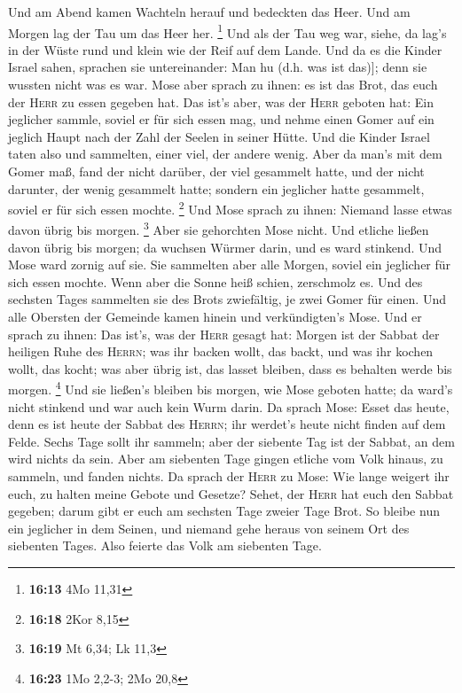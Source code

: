  Und am Abend kamen Wachteln herauf und bedeckten das
Heer. Und am Morgen lag der Tau um das Heer her. \footnote{\textbf{16:13}
  4Mo 11,31}  Und als der Tau weg war, siehe, da lag's in
der Wüste rund und klein wie der Reif auf dem Lande.  Und
da es die Kinder Israel sahen, sprachen sie untereinander: Man hu (d.h.
was ist das){]}; denn sie wussten nicht was es war. Mose aber sprach zu
ihnen: es ist das Brot, das euch der \textsc{Herr} zu essen gegeben hat.
 Das ist's aber, was der \textsc{Herr} geboten hat: Ein
jeglicher sammle, soviel er für sich essen mag, und nehme einen Gomer
auf ein jeglich Haupt nach der Zahl der Seelen in seiner Hütte.
 Und die Kinder Israel taten also und sammelten, einer
viel, der andere wenig.  Aber da man's mit dem Gomer maß,
fand der nicht darüber, der viel gesammelt hatte, und der nicht
darunter, der wenig gesammelt hatte; sondern ein jeglicher hatte
gesammelt, soviel er für sich essen mochte. \footnote{\textbf{16:18}
  2Kor 8,15}  Und Mose sprach zu ihnen: Niemand lasse
etwas davon übrig bis morgen. \footnote{\textbf{16:19} Mt 6,34; Lk 11,3}
 Aber sie gehorchten Mose nicht. Und etliche ließen davon
übrig bis morgen; da wuchsen Würmer darin, und es ward stinkend. Und
Mose ward zornig auf sie.  Sie sammelten aber alle
Morgen, soviel ein jeglicher für sich essen mochte. Wenn aber die Sonne
heiß schien, zerschmolz es.  Und des sechsten Tages
sammelten sie des Brots zwiefältig, je zwei Gomer für einen. Und alle
Obersten der Gemeinde kamen hinein und verkündigten's Mose.
 Und er sprach zu ihnen: Das ist's, was der \textsc{Herr}
gesagt hat: Morgen ist der Sabbat der heiligen Ruhe des \textsc{Herrn};
was ihr backen wollt, das backt, und was ihr kochen wollt, das kocht;
was aber übrig ist, das lasset bleiben, dass es behalten werde bis
morgen. \footnote{\textbf{16:23} 1Mo 2,2-3; 2Mo 20,8} 
Und sie ließen's bleiben bis morgen, wie Mose geboten hatte; da ward's
nicht stinkend und war auch kein Wurm darin.  Da sprach
Mose: Esset das heute, denn es ist heute der Sabbat des \textsc{Herrn};
ihr werdet's heute nicht finden auf dem Felde.  Sechs
Tage sollt ihr sammeln; aber der siebente Tag ist der Sabbat, an dem
wird nichts da sein.  Aber am siebenten Tage gingen
etliche vom Volk hinaus, zu sammeln, und fanden nichts. 
Da sprach der \textsc{Herr} zu Mose: Wie lange weigert ihr euch, zu
halten meine Gebote und Gesetze?  Sehet, der
\textsc{Herr} hat euch den Sabbat gegeben; darum gibt er euch am
sechsten Tage zweier Tage Brot. So bleibe nun ein jeglicher in dem
Seinen, und niemand gehe heraus von seinem Ort des siebenten Tages.
 Also feierte das Volk am siebenten Tage.

